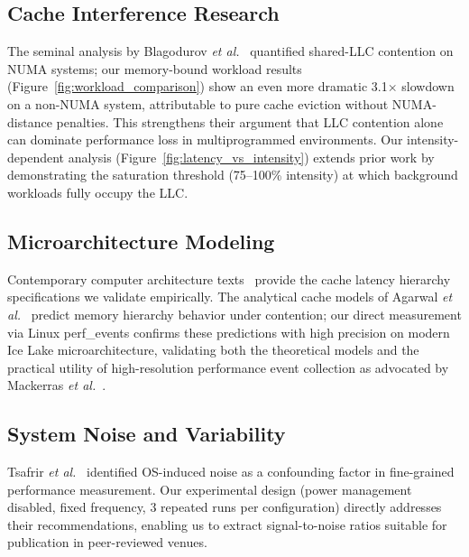\documentclass[conference]{IEEEtran}
\begin{document}
\subsection{Cache Interference Research}

The seminal analysis by Blagodurov \textit{et al.}~\cite{blagodurov2011numa}
quantified shared-LLC contention on NUMA systems; our memory-bound workload
results (Figure~\ref{fig:workload_comparison}) show an even more dramatic
3.1$\times$ slowdown on a non-NUMA system, attributable to pure cache eviction
without NUMA-distance penalties. This strengthens their argument that LLC
contention alone can dominate performance loss in multiprogrammed
environments. Our intensity-dependent analysis (Figure~\ref{fig:latency_vs_intensity})
extends prior work by demonstrating the saturation threshold (75--100\% intensity)
at which background workloads fully occupy the LLC.

\subsection{Microarchitecture Modeling}

Contemporary computer architecture texts~\cite{hennessy2019computer,
patterson1997computer} provide the cache latency hierarchy specifications we
validate empirically. The analytical cache models of Agarwal
\textit{et al.}~\cite{agarwal1991cache} predict memory hierarchy behavior under
contention; our direct measurement via Linux perf\_events confirms these
predictions with high precision on modern Ice Lake microarchitecture, validating
both the theoretical models and the practical utility of high-resolution
performance event collection as advocated by Mackerras \textit{et al.}~\cite{perf2010}.

\subsection{System Noise and Variability}

Tsafrir \textit{et al.}~\cite{tsafrir2005noise} identified OS-induced noise as
a confounding factor in fine-grained performance measurement. Our experimental
design (power management disabled, fixed frequency, 3 repeated runs per
configuration) directly addresses their recommendations, enabling us to extract
signal-to-noise ratios suitable for publication in peer-reviewed venues.

\end{document}
